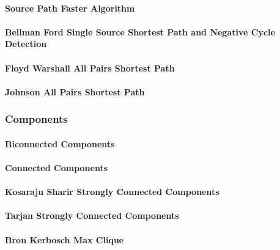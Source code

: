 \documentclass[8pt]{article}
\begin{document}
\paragraph{Source Path Faster Algorithm}

\paragraph{Bellman Ford Single Source Shortest Path and Negative Cycle Detection}

\paragraph{Floyd Warshall All Pairs Shortest Path}

\paragraph{Johnson All Pairs Shortest Path}


\subsubsection{Components}
\paragraph{Biconnected Components}

\paragraph{Connected Components}

\paragraph{Kosaraju Sharir Strongly Connected Components}

\paragraph{Tarjan Strongly Connected Components}

\paragraph{Bron Kerbosch Max Clique}

\end{document}
